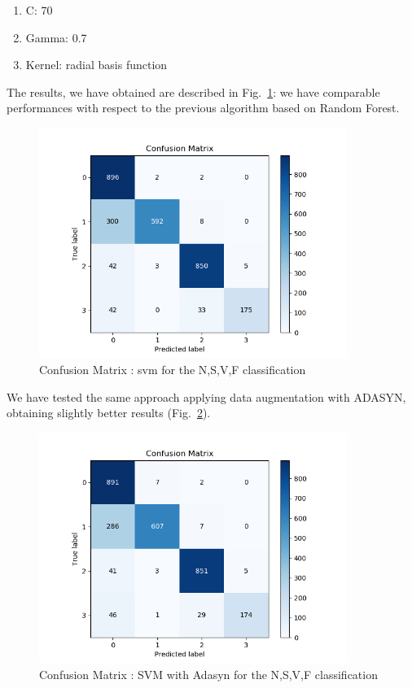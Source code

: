 \documentclass[LaM,binding=0.6cm]{sapthesis}
\begin{document}
\begin{enumerate}
\item C: 70
\item Gamma: 0.7
\item Kernel: radial basis function
\end{enumerate}
The results, we have obtained are described in Fig.~\ref{fig:svc2}: we have comparable performances with respect to the previous algorithm based on Random Forest.
\begin{figure} \centering
    \includegraphics[width=100mm,scale=0.7]{confusion-matrix-linear-not-linear-no-aug-smaller-test.png}
    \caption{Confusion Matrix : svm for the N,S,V,F classification}
    \label{fig:svc2}
\end{figure}
We have tested the same approach applying data augmentation with ADASYN, obtaining slightly better results (Fig.~\ref{fig:svc3}).
\begin{figure}  \centering
    \includegraphics[width=100mm,scale=0.7]{confusion-matrix-linear-not-linear-adasyn-smaller-test.png}
    \caption{Confusion Matrix : SVM with Adasyn for the N,S,V,F classification}
    \label{fig:svc3}
\end{figure}
\end{document}
